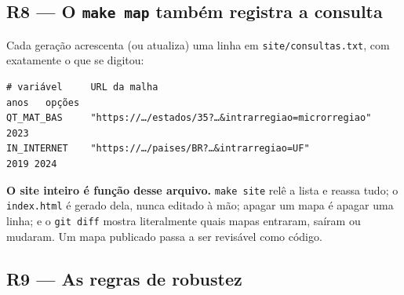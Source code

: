 \documentclass[11pt]{article}
\begin{document}
\subsection{R8 — O \texttt{make map} também registra a consulta}
\label{sec:orgfac8044}

Cada geração acrescenta (ou atualiza) uma linha em \texttt{site/consultas.txt}, com
exatamente o que se digitou:

\begin{verbatim}
# variável     URL da malha                                          anos   opções
QT_MAT_BAS     "https://…/estados/35?…&intrarregiao=microrregiao"    2023
IN_INTERNET    "https://…/paises/BR?…&intrarregiao=UF"               2019 2024
\end{verbatim}

\textbf{O site inteiro é função desse arquivo.} \texttt{make site} relê a lista e reassa
tudo; o \texttt{index.html} é gerado dela, nunca editado à mão; apagar um mapa é
apagar uma linha; e o \texttt{git diff} mostra literalmente quais mapas entraram,
saíram ou mudaram. Um mapa publicado passa a ser revisável como código.
\subsection{R9 — As regras de robustez}
\label{sec:org4a1439f}
\end{document}
